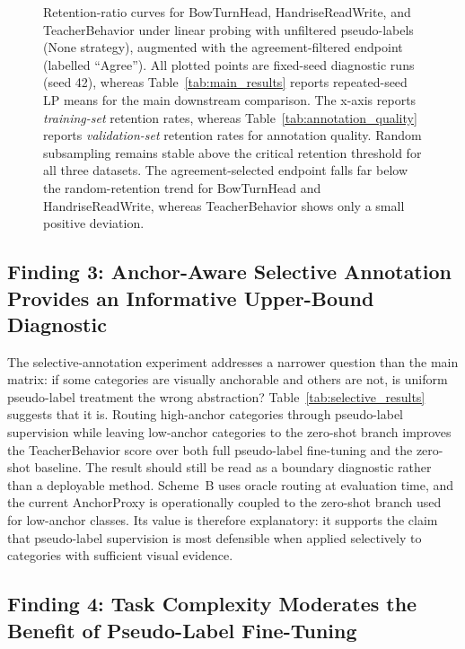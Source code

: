 \documentclass[10pt,letterpaper]{article}
\begin{document}
\begin{figure}[H]
\caption{Retention-ratio curves for BowTurnHead, HandriseReadWrite,
and TeacherBehavior under linear probing with unfiltered pseudo-labels
(None strategy), augmented with the agreement-filtered endpoint
(labelled ``Agree''). All plotted points are fixed-seed diagnostic
runs (seed 42), whereas Table~\ref{tab:main_results} reports
repeated-seed LP means for the main downstream comparison.
The x-axis reports \emph{training-set} retention rates, whereas
Table~\ref{tab:annotation_quality} reports \emph{validation-set}
retention rates for annotation quality. Random subsampling remains
stable above the critical retention threshold for all three datasets.
The agreement-selected endpoint falls far below the random-retention
trend for BowTurnHead and HandriseReadWrite, whereas TeacherBehavior
shows only a small positive deviation.}
\label{fig:retention_curve}
\end{figure}

\subsection*{Finding 3: Anchor-Aware Selective Annotation Provides an
Informative Upper-Bound Diagnostic}

The selective-annotation experiment addresses a narrower question than
the main matrix: if some categories are visually anchorable and others
are not, is uniform pseudo-label treatment the wrong abstraction?
Table~\ref{tab:selective_results} suggests that it is.
Routing high-anchor categories through pseudo-label supervision while
leaving low-anchor categories to the zero-shot branch improves the
TeacherBehavior score over both full pseudo-label fine-tuning and the
zero-shot baseline.
The result should still be read as a boundary diagnostic rather than a
deployable method.
Scheme~B uses oracle routing at evaluation time, and the current
AnchorProxy is operationally coupled to the zero-shot branch used for
low-anchor classes.
Its value is therefore explanatory: it supports the claim that
pseudo-label supervision is most defensible when applied selectively
to categories with sufficient visual evidence.

\subsection*{Finding 4: Task Complexity Moderates the Benefit of
Pseudo-Label Fine-Tuning}
\end{document}
